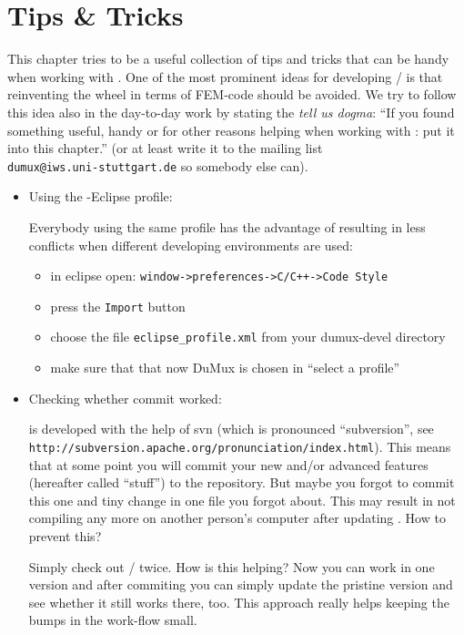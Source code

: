 \chapter{Tips \& Tricks}

This chapter tries to be a useful collection of tips and tricks that can be handy when working with 
\Dumux. One of the most prominent ideas for developing \Dune / \Dumux is that reinventing the wheel in terms of FEM-code should
be avoided.  We try to follow this idea also in the day-to-day work by stating the \emph{tell us dogma}: ``If you found something useful, 
handy or for other reasons helping when working with \Dumux: put it into this chapter.'' (or at least write it to the mailing list \\ \verb+dumux@iws.uni-stuttgart.de+ so somebody else can). 
\begin{itemize}
 \item Using the \Dumux-Eclipse profile:

Everybody using the same profile has the advantage of  resulting in less conflicts when different developing environments are used:
\begin{itemize}
 \item in eclipse open: \verb#window->preferences->C/C++->Code Style#
  \item press the \verb+Import+ button
  \item choose the file \verb+eclipse_profile.xml+ from your dumux-devel directory
  \item make sure that that now DuMux is chosen in ``select a profile''
\end{itemize}

\item Checking whether commit worked:

\Dumux is developed with the help of svn (which is pronounced ``subversion'', see \\\verb+http://subversion.apache.org/pronunciation/index.html+). This means that at some point you will commit your new 
and/or advanced features (hereafter called ``stuff'') to the repository. But maybe you forgot to commit this one and tiny change in one file you forgot about. 
This may result in \Dumux not compiling any more on another person's computer after updating . How to prevent this?

Simply check out \Dune / \Dumux twice. How is this helping? Now you can work in one version and after commiting you can simply update the pristine version and see whether it still works there, too. 
This approach really helps keeping the bumps in the work-flow small.


\end{itemize}
